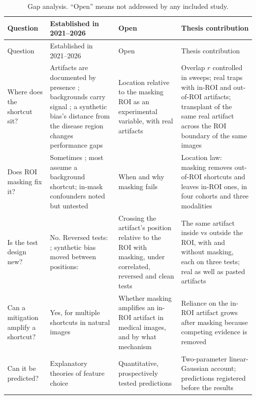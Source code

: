 \documentclass[11pt,a4paper]{article}
\begin{document}
\begin{longtable}{P{2.2cm}P{4.5cm}P{3.8cm}P{4.5cm}}
\caption{Gap analysis. ``Open'' means not addressed by any included study.}\label{tab:gap}\\\toprule
Question & Established in 2021--2026 & Open & Thesis contribution \\\midrule\endfirsthead
\toprule Question & Established in 2021--2026 & Open & Thesis contribution \\\midrule\endhead
\bottomrule\endfoot
Where does the shortcut sit? & Artifacts are documented by presence \citep{winkler2021scalebars,rueckel2021pneumothorax,lin2024segshortcut,wang2024hair}; backgrounds carry signal \citep{maguolo2021critic,sourget2025mask,xiao2021noise}; a synthetic bias's distance from the disease region changes performance gaps \citep{stanley2024simba} & Location relative to the masking ROI as an experimental variable, with real artifacts & Overlap $r$ controlled in sweeps; real traps with in-ROI and out-of-ROI artifacts; transplant of the same real artifact across the ROI boundary of the same images \\
Does ROI masking fix it? & Sometimes \citep{maron2021confounding,bassi2024isnet}; most assume a background shortcut; in-mask confounders noted but untested \citep{viviano2021saliency,benahmed2022multisite,pahde2025ensuring} & When and why masking fails & Location law: masking removes out-of-ROI shortcuts and leaves in-ROI ones, in four cohorts and three modalities \\
Is the test design new? & No. Reversed tests: \citet{arjovsky2019irm,puli2022nurd,bassi2024isnet,corbetta2026beyond}; synthetic bias moved between positions: \citet{stanley2024simba,boland2024shortcuts} & Crossing the artifact's position relative to the ROI with masking, under correlated, reversed and clean tests & The same artifact inside vs outside the ROI, with and without masking, each on three tests; real as well as pasted artifacts \\
Can a mitigation amplify a shortcut? & Yes, for multiple shortcuts in natural images \citep{li2023whacamole} & Whether masking amplifies an in-ROI artifact in medical images, and by what mechanism & Reliance on the in-ROI artifact grows after masking because competing evidence is removed \\
Can it be predicted? & Explanatory theories of feature choice \citep{nagarajan2021understanding,puli2023dontblame,hermann2024foundations} & Quantitative, prospectively tested predictions & Two-parameter linear-Gaussian account; predictions registered before the results \\

\end{longtable}
\end{document}
